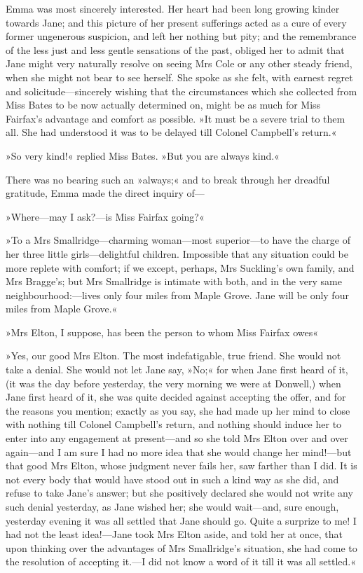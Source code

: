 Emma was most sincerely interested. Her heart had been long growing kinder towards Jane; and this picture of her present sufferings acted as a cure of every former ungenerous suspicion, and left her nothing but pity; and the remembrance of the less just and less gentle sensations of the past, obliged her to admit that Jane might very naturally resolve on seeing Mrs Cole or any other steady friend, when she might not bear to see herself. She spoke as she felt, with earnest regret and solicitude—sincerely wishing that the circumstances which she collected from Miss Bates to be now actually determined on, might be as much for Miss Fairfax's advantage and comfort as possible. »It must be a severe trial to them all. She had understood it was to be delayed till Colonel Campbell's return.«

»So very kind!« replied Miss Bates. »But you are always kind.«

There was no bearing such an »always;« and to break through her dreadful gratitude, Emma made the direct inquiry of—

»Where—may I ask?—is Miss Fairfax going?«

»To a Mrs Smallridge—charming woman—most superior—to have the charge of her three little girls—delightful children. Impossible that any situation could be more replete with comfort; if we except, perhaps, Mrs Suckling's own family, and Mrs Bragge's; but Mrs Smallridge is intimate with both, and in the very same neighbourhood:—lives only four miles from Maple Grove. Jane will be only four miles from Maple Grove.«

»Mrs Elton, I suppose, has been the person to whom Miss Fairfax owes\longdash«

»Yes, our good Mrs Elton. The most indefatigable, true friend. She would not take a denial. She would not let Jane say, »No;« for when Jane first heard of it, (it was the day before yesterday, the very morning we were at Donwell,) when Jane first heard of it, she was quite decided against accepting the offer, and for the reasons you mention; exactly as you say, she had made up her mind to close with nothing till Colonel Campbell's return, and nothing should induce her to enter into any engagement at present—and so she told Mrs Elton over and over again—and I am sure I had no more idea that she would change her mind!—but that good Mrs Elton, whose judgment never fails her, saw farther than I did. It is not every body that would have stood out in such a kind way as she did, and refuse to take Jane's answer; but she positively declared she would not write any such denial yesterday, as Jane wished her; she would wait—and, sure enough, yesterday evening it was all settled that Jane should go. Quite a surprize to me! I had not the least idea!—Jane took Mrs Elton aside, and told her at once, that upon thinking over the advantages of Mrs Smallridge's situation, she had come to the resolution of accepting it.—I did not know a word of it till it was all settled.«

